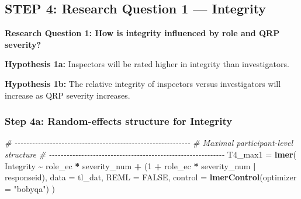 \documentclass[
]{article}
\newenvironment{Shaded}{\begin{snugshade}}{\end{snugshade}}
\newcommand{\AttributeTok}[1]{\textcolor[rgb]{0.13,0.29,0.53}{#1}}
\newcommand{\CommentTok}[1]{\textcolor[rgb]{0.56,0.35,0.01}{\textit{#1}}}
\newcommand{\ConstantTok}[1]{\textcolor[rgb]{0.56,0.35,0.01}{#1}}
\newcommand{\DecValTok}[1]{\textcolor[rgb]{0.00,0.00,0.81}{#1}}
\newcommand{\FunctionTok}[1]{\textcolor[rgb]{0.13,0.29,0.53}{\textbf{#1}}}
\newcommand{\NormalTok}[1]{#1}
\newcommand{\OtherTok}[1]{\textcolor[rgb]{0.56,0.35,0.01}{#1}}
\newcommand{\SpecialCharTok}[1]{\textcolor[rgb]{0.81,0.36,0.00}{\textbf{#1}}}
\newcommand{\StringTok}[1]{\textcolor[rgb]{0.31,0.60,0.02}{#1}}
\begin{document}
\begin{Shaded}
\end{Shaded}

\subsection{STEP 4: Research Question 1 ---
Integrity}\label{step-4-research-question-1-integrity}

\textbf{Research Question 1: How is integrity influenced by role and QRP
severity?}

\textbf{Hypothesis 1a:} Inspectors will be rated higher in integrity
than investigators.

\textbf{Hypothesis 1b:} The relative integrity of inspectors versus
investigators will increase as QRP severity increases.

\subsubsection{Step 4a: Random-effects structure for
Integrity}\label{step-4a-random-effects-structure-for-integrity}

\begin{Shaded}
\begin{Highlighting}[]
\CommentTok{\# {-}{-}{-}{-}{-}{-}{-}{-}{-}{-}{-}{-}{-}{-}{-}{-}{-}{-}{-}{-}{-}{-}{-}{-}{-}{-}{-}{-}{-}{-}{-}{-}{-}{-}{-}{-}{-}{-}{-}{-}{-}{-}{-}{-}{-}{-}{-}{-}{-}{-}{-}{-}{-}{-}{-}{-}{-}{-}{-}{-}}
\CommentTok{\# Maximal participant{-}level structure}
\CommentTok{\# {-}{-}{-}{-}{-}{-}{-}{-}{-}{-}{-}{-}{-}{-}{-}{-}{-}{-}{-}{-}{-}{-}{-}{-}{-}{-}{-}{-}{-}{-}{-}{-}{-}{-}{-}{-}{-}{-}{-}{-}{-}{-}{-}{-}{-}{-}{-}{-}{-}{-}{-}{-}{-}{-}{-}{-}{-}{-}{-}{-}}
\NormalTok{T4\_max1 }\OtherTok{=} \FunctionTok{lmer}\NormalTok{(}
\NormalTok{  Integrity }\SpecialCharTok{\textasciitilde{}}\NormalTok{ role\_ec }\SpecialCharTok{*}\NormalTok{ severity\_num }\SpecialCharTok{+}
\NormalTok{    (}\DecValTok{1} \SpecialCharTok{+}\NormalTok{ role\_ec }\SpecialCharTok{*}\NormalTok{ severity\_num }\SpecialCharTok{|}\NormalTok{ responseid),}
  \AttributeTok{data =}\NormalTok{ tl\_dat,}
  \AttributeTok{REML =} \ConstantTok{FALSE}\NormalTok{,}
  \AttributeTok{control =} \FunctionTok{lmerControl}\NormalTok{(}\AttributeTok{optimizer =} \StringTok{"bobyqa"}\NormalTok{)}
\NormalTok{)}
\end{Highlighting}
\end{Shaded}
\end{document}
